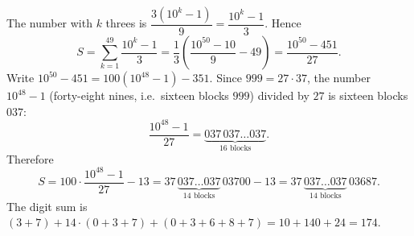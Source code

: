 The number with $k$ threes is $\dfrac{3\left(10^k-1\right)}{9}=\dfrac{10^k-1}{3}$. Hence
\[
S=\sum_{k=1}^{49}\dfrac{10^k-1}{3}=\dfrac{1}{3}\left(\dfrac{10^{50}-10}{9}-49\right)=\dfrac{10^{50}-451}{27}.
\]
Write $10^{50}-451=100\left(10^{48}-1\right)-351$. Since $999=27\cdot37$, the number $10^{48}-1$ (forty-eight nines, i.e.\ sixteen blocks $999$) divided by $27$ is sixteen blocks $037$:
\[
\dfrac{10^{48}-1}{27}=\underbrace{037\,037\ldots037}_{16\text{ blocks}} .
\]
Therefore
\[
S=100\cdot\dfrac{10^{48}-1}{27}-13=37\,\underbrace{037\ldots037}_{14\text{ blocks}}\,03700-13=37\,\underbrace{037\ldots037}_{14\text{ blocks}}\,03687 .
\]
The digit sum is $(3+7)+14\cdot(0+3+7)+(0+3+6+8+7)=10+140+24=\boxed{174}$.
